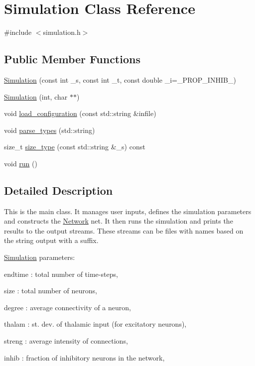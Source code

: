 \hypertarget{classSimulation}{}\section{Simulation Class Reference}
\label{classSimulation}


{\ttfamily \#include $<$simulation.\+h$>$}

\subsection*{Public Member Functions}
\begin{DoxyCompactItemize}
\item 
\hyperlink{classSimulation_a03b7d1f1e35474eb621a3a69a225af97}{Simulation} (const int \+\_\+s, const int \+\_\+t, const double \+\_\+i=\+\_\+\+P\+R\+O\+P\+\_\+\+I\+N\+H\+I\+B\+\_\+)
\item 
\hyperlink{classSimulation_a2cc0f2dc7164778a64462d8b9ec5206d}{Simulation} (int, char $\ast$$\ast$)
\item 
void \hyperlink{classSimulation_acd6ce915b07465d9aaaa5fdcbb5ae077}{load\+\_\+configuration} (const std\+::string \&infile)
\item 
void \hyperlink{classSimulation_afc095e76c2bcee6d31a4614022d609c3}{parse\+\_\+types} (std\+::string)
\item 
size\+\_\+t \hyperlink{classSimulation_a7d0ca858dfec187001ecbab2081f9d04}{size\+\_\+type} (const std\+::string \&\+\_\+s) const
\item 
void \hyperlink{classSimulation_ae5c367f87c0b5dc9740bc6d00e44e72c}{run} ()
\end{DoxyCompactItemize}


\subsection{Detailed Description}
This is the main class. It manages user inputs, defines the simulation parameters and constructs the \hyperlink{classNetwork}{Network} net. It then runs the simulation and prints the results to the output streams. These streams can be files with names based on the string output with a suffix.

\hyperlink{classSimulation}{Simulation} parameters\+:
\begin{DoxyItemize}
\item endtime \+: total number of time-\/steps,
\item size \+: total number of neurons,
\item degree \+: average connectivity of a neuron,
\item thalam \+: st. dev. of thalamic input (for excitatory neurons),
\item streng \+: average intensity of connections,
\item inhib \+: fraction of inhibitory neurons in the network,
\end{DoxyItemize}

